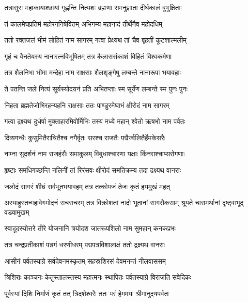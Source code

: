 \twolineshloka
{तत्रासुरा महाकायाश्छायां गृह्णन्ति नित्यशः}
{ब्रह्मणा समनुज्ञाता दीर्घकालं बुभुक्षिताः} %

\twolineshloka
{तं कालमेघप्रतिमं महोरगनिषेवितम्}
{अभिगम्य महानादं तीर्थेनैव महोदधिम्} %

\twolineshloka
{ततो रक्तजलं भीमं लोहितं नाम सागरम्}
{गत्वा प्रेक्ष्यथ तां चैव बृहतीं कूटशाल्मलीम्} %

\twolineshloka
{गृहं च वैनतेयस्य नानारत्नविभूषितम्}
{तत्र कैलाससंकाशं विहितं विश्वकर्मणा} %

\twolineshloka
{तत्र शैलनिभा भीमा मन्देहा नाम राक्षसाः}
{शैलशृङ्गेषु लम्बन्ते नानारूपा भयावहाः} %

\twolineshloka
{ते पतन्ति जले नित्यं सूर्यस्योदयनं प्रति}
{अभितप्ताः स्म सूर्येण लम्बन्ते स्म पुनः पुनः} %

\twolineshloka
{निहता ब्रह्मतेजोभिरहन्यहनि राक्षसाः}
{ततः पाण्डुरमेघाभं क्षीरोदं नाम सागरम्} %

\twolineshloka
{गत्वा द्रक्ष्यथ दुर्धर्षा मुक्ताहारमिवोर्मिभिः}
{तस्य मध्ये महान् श्वेतो ऋषभो नाम पर्वतः} %

\twolineshloka
{दिव्यगन्धैः कुसुमितैराचितैश्च नगैर्वृतः}
{सरश्च राजतैः पद्मैर्ज्वलितैर्हेमकेसरैः} %

\twolineshloka
{नाम्ना सुदर्शनं नाम राजहंसैः समाकुलम्}
{विबुधाश्चारणा यक्षाः किंनराश्चाप्सरोगणाः} %

\twolineshloka
{हृष्टाः समधिगच्छन्ति नलिनीं तां रिरंसवः}
{क्षीरोदं समतिक्रम्य तदा द्रक्ष्यथ वानराः} %

\twolineshloka
{जलोदं सागरं शीघ्रं सर्वभूतभयावहम्}
{तत्र तत्कोपजं तेजः कृतं हयमुखं महत्} %

\threelineshloka
{अस्याहुस्तन्महावेगमोदनं सचराचरम्}
{तत्र विक्रोशतां नादो भूतानां सागरौकसाम्}
{श्रूयते चासमर्थानां दृष्ट्वाभूद् वडवामुखम्} %

\twolineshloka
{स्वादूदस्योत्तरे तीरे योजनानि त्रयोदश}
{जातरूपशिलो नाम सुमहान् कनकप्रभः} %

\twolineshloka
{तत्र चन्द्रप्रतीकाशं पन्नगं धरणीधरम्}
{पद्मपत्रविशालाक्षं ततो द्रक्ष्यथ वानराः} %

\twolineshloka
{आसीनं पर्वतस्याग्रे सर्वदेवनमस्कृतम्}
{सहस्रशिरसं देवमनन्तं नीलवाससम्} %

\twolineshloka
{त्रिशिराः काञ्चनः केतुस्तालस्तस्य महात्मनः}
{स्थापितः पर्वतस्याग्रे विराजति सवेदिकः} %

\twolineshloka
{पूर्वस्यां दिशि निर्माणं कृतं तत् त्रिदशेश्वरैः}
{ततः परं हेममयः श्रीमानुदयपर्वतः} %

